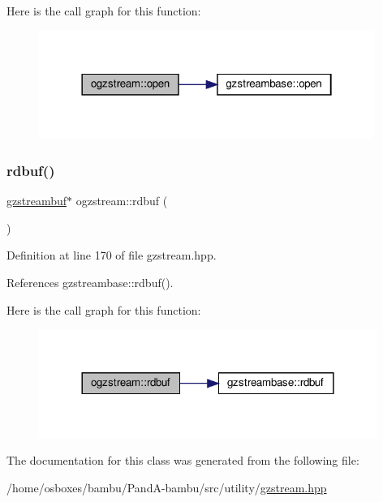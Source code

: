 Here is the call graph for this function\+:
\nopagebreak
\begin{figure}[H]
\begin{center}
\leavevmode
\includegraphics[width=310pt]{d6/d66/classogzstream_aff704df274dda46c84ef1e814e84b05e_cgraph}
\end{center}
\end{figure}
\mbox{\label{classogzstream_a1034f1ed3d34e9db919d240a93d3888d}} 
\subsubsection{\texorpdfstring{rdbuf()}{rdbuf()}}
{\footnotesize\ttfamily \hyperlink{classgzstreambuf}{gzstreambuf}$\ast$ ogzstream\+::rdbuf (\begin{DoxyParamCaption}{ }\end{DoxyParamCaption})\hspace{0.3cm}{\ttfamily [inline]}}



Definition at line 170 of file gzstream.\+hpp.



References gzstreambase\+::rdbuf().

Here is the call graph for this function\+:
\nopagebreak
\begin{figure}[H]
\begin{center}
\leavevmode
\includegraphics[width=312pt]{d6/d66/classogzstream_a1034f1ed3d34e9db919d240a93d3888d_cgraph}
\end{center}
\end{figure}


The documentation for this class was generated from the following file\+:\begin{DoxyCompactItemize}
\item 
/home/osboxes/bambu/\+Pand\+A-\/bambu/src/utility/\hyperlink{gzstream_8hpp}{gzstream.\+hpp}\end{DoxyCompactItemize}
